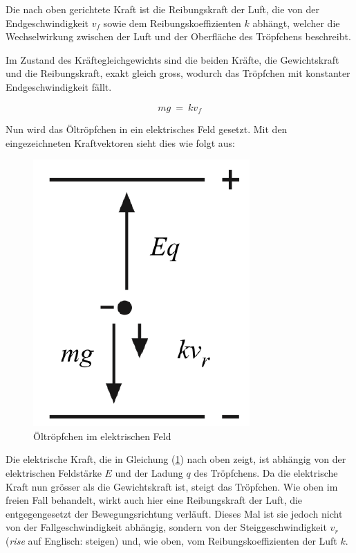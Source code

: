 Die nach oben gerichtete Kraft ist die Reibungskraft der Luft, die von der Endgeschwindigkeit $v_f$ sowie dem Reibungskoeffizienten $k$ abhängt, welcher die Wechselwirkung zwischen der Luft und der Oberfläche des Tröpfchens beschreibt.

Im Zustand des Kräftegleichgewichts sind die beiden Kräfte, die Gewichtskraft und die Reibungskraft, exakt gleich gross, wodurch das Tröpfchen mit konstanter Endgeschwindigkeit fällt.

\begin{equation}\label{eq:kräfteFreierFall}
	mg \ = \ kv_f
\end{equation}   

\noindent Nun wird das Öltröpfchen in ein elektrisches Feld gesetzt. Mit den eingezeichneten Kraftvektoren sieht dies wie folgt aus:

\begin{figure}[h]
	\begin{center}
		\includegraphics[scale=0.5]{bilder/pdf/Abbildung2_elektrischesFeld.pdf}
		\caption{Öltröpfchen im elektrischen Feld \parencite[1]{instructionManualHalogen}}
		\label{fig:elektrischesFeld}
	\end{center}
\end{figure}

\noindent Die elektrische Kraft, die in  Gleichung (\ref{fig:elektrischesFeld}) nach oben zeigt, ist abhängig von der elektrischen Feldstärke $E$ und der Ladung $q$ des Tröpfchens. Da die elektrische Kraft nun grösser als die Gewichtskraft ist, steigt das Tröpfchen. Wie oben im freien Fall behandelt, wirkt auch hier eine Reibungskraft der Luft, die entgegengesetzt der Bewegungsrichtung verläuft. Dieses Mal ist sie jedoch nicht von der Fallgeschwindigkeit abhängig, sondern von der Steiggeschwindigkeit $v_r$ (\textit{rise} auf Englisch: steigen) und, wie oben, vom Reibungskoeffizienten der Luft $k$.

